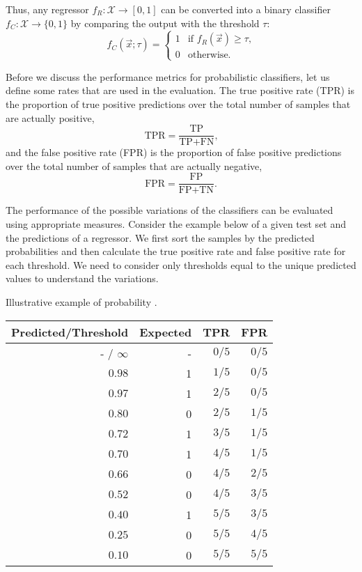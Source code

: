 Thus, any regressor $f_R : \mathcal{X} \rightarrow [0, 1]$ can be converted into a binary
classifier $f_C : \mathcal{X} \rightarrow \{0, 1\}$ by comparing the output with the
threshold $\tau$:
\begin{equation*}
  f_C(\vec{x}; \tau) = \begin{cases}
    1 & \text{if } f_R(\vec{x}) \geq \tau\text{,} \\
    0 & \text{otherwise}\text{.}
  \end{cases}
\end{equation*}

Before we discuss the performance metrics for probabilistic classifiers, let us define
some rates that are used in the evaluation.  The true positive rate (TPR) is the proportion
of true positive predictions over the total number of samples that are actually positive,
\begin{equation*}
  \text{TPR} = \frac{\text{TP}}{\text{TP} + \text{FN}}\text{,}
\end{equation*}
and the false positive rate (FPR) is the proportion of false positive predictions over the
total number of samples that are actually negative,
\begin{equation*}
  \text{FPR} = \frac{\text{FP}}{\text{FP} + \text{TN}}\text{.}
\end{equation*}

The performance of the possible variations of the classifiers can be evaluated using
appropriate measures.  Consider the example below of a given test set and the predictions
of a regressor.  We first sort the samples by the predicted probabilities and then
calculate the true positive rate and false positive rate for each threshold.
We need to consider only thresholds equal to the unique predicted values to understand the
variations.

\begin{tablebox}[label=tab:prob-reg-example]{Illustrative example of probability .}
  \centering
  \begin{tabular}{rrrr}
    \toprule
    \textbf{Predicted/Threshold} & \textbf{Expected} & \textbf{TPR} & \textbf{FPR}  \\
    \midrule
    - / $\infty$ & - & $0/5$ & $0/5$ \\
    $0.98$       & 1 & $1/5$ & $0/5$ \\
    $0.97$       & 1 & $2/5$ & $0/5$ \\
    $0.80$       & 0 & $2/5$ & $1/5$ \\
    $0.72$       & 1 & $3/5$ & $1/5$ \\
    $0.70$       & 1 & $4/5$ & $1/5$ \\
    $0.66$       & 0 & $4/5$ & $2/5$ \\
    $0.52$       & 0 & $4/5$ & $3/5$ \\
    $0.40$       & 1 & $5/5$ & $3/5$ \\
    $0.25$       & 0 & $5/5$ & $4/5$ \\
    $0.10$       & 0 & $5/5$ & $5/5$ \\
    \bottomrule
  \end{tabular}
\end{tablebox}


